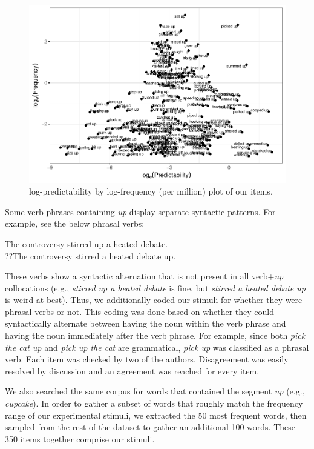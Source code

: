 \documentclass[
  man,floatsintext]{apa6}
\begin{document}
\begin{figure}

{\centering \includegraphics[width=0.8\linewidth]{write-up_files/figure-latex/stimplot2-1} 

}

\caption{log-predictability by log-frequency (per million) plot of our items.}\label{fig:stimplot2}
\end{figure}

Some verb phrases containing \emph{up} display separate syntactic patterns. For example, see the below phrasal verbs:

\begin{exe} 
\ex
  \begin{xlist}
    \ex The controversy stirred up a heated debate. \\
    \ex ??The controversy stirred a heated debate up. \\
  \end{xlist}
\end{exe}

These verbs show a syntactic alternation that is not present in all verb+\emph{up} collocations (e.g., \emph{stirred up a heated debate} is fine, but \emph{stirred a heated debate up} is weird at best). Thus, we additionally coded our stimuli for whether they were phrasal verbs or not. This coding was done based on whether they could syntactically alternate between having the noun within the verb phrase and having the noun immediately after the verb phrase. For example, since both \emph{pick the cat up} and \emph{pick up the cat} are grammatical, \emph{pick up} was classified as a phrasal verb. Each item was checked by two of the authors. Disagreement was easily resolved by discussion and an agreement was reached for every item.

We also searched the same corpus for words that contained the segment \emph{up} (e.g., \emph{cupcake}). In order to gather a subset of words that roughly match the frequency range of our experimental stimuli, we extracted the 50 most frequent words, then sampled from the rest of the dataset to gather an additional 100 words. These 350 items together comprise our stimuli.
\end{document}
